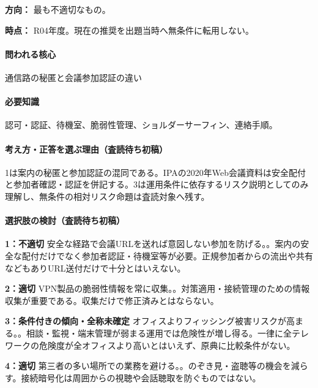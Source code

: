 \noindent\textbf{方向：} 最も不適切なもの。\par

\noindent\textbf{時点：} R04年度。現在の推奨を出題当時へ無条件に転用しない。\par

\paragraph{問われる核心} 通信路の秘匿と会議参加認証の違い

\paragraph{必要知識} 認可・認証、待機室、脆弱性管理、ショルダーサーフィン、連絡手順。

\paragraph{考え方・正答を選ぶ理由（査読待ち初稿）} 1は案内の秘匿と参加認証の混同である。IPAの2020年Web会議資料は安全配付と参加者確認・認証を併記する。3は運用条件に依存するリスク説明としてのみ理解し、無条件の相対リスク命題は査読対象へ残す。

\paragraph{選択肢の検討（査読待ち初稿）}\mbox{}\par

\noindent\textbf{1：不適切} 安全な経路で会議URLを送れば意図しない参加を防げる。。案内の安全な配付だけでなく参加者認証・待機室等が必要。正規参加者からの流出や共有などもありURL送付だけで十分とはいえない。\par

\noindent\textbf{2：適切} VPN製品の脆弱性情報を常に収集。。対策適用・接続管理のための情報収集が重要である。収集だけで修正済みとはならない。\par

\noindent\textbf{3：条件付きの傾向・全称未確定} オフィスよりフィッシング被害リスクが高まる。。相談・監視・端末管理が弱まる運用では危険性が増し得る。一律に全テレワークの危険度が全オフィスより高いとはいえず、原典に比較条件がない。\par

\noindent\textbf{4：適切} 第三者の多い場所での業務を避ける。。のぞき見・盗聴等の機会を減らす。接続暗号化は周囲からの視聴や会話聴取を防ぐものではない。\par

